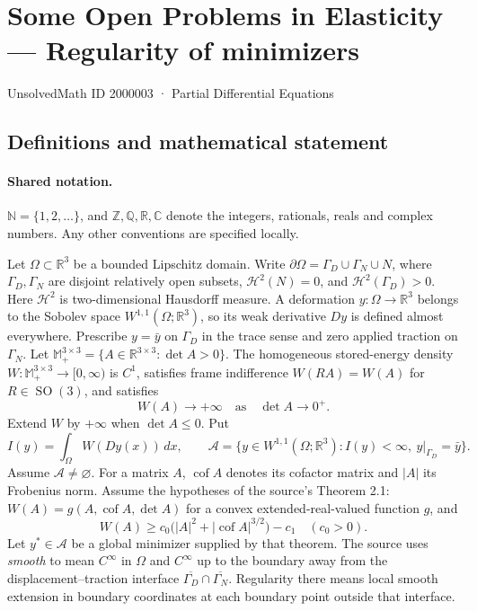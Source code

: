 \documentclass[11pt]{book}
\begin{document}
\setcounter{section}{2000002}
\section{Some Open Problems in Elasticity — Regularity of minimizers}\label{2000003}
{\small\sffamily UnsolvedMath ID 2000003 · Partial Differential Equations}
\subsection{Definitions and mathematical statement}

\paragraph{Shared notation.}$\mathbb N=\{1,2,\ldots\}$, and $\mathbb Z,\mathbb Q,\mathbb R,\mathbb C$ denote the integers, rationals, reals and complex numbers. Any other conventions are specified locally.


Let $\Omega\subset\mathbb R^3$ be a bounded Lipschitz domain. Write $\partial\Omega=\Gamma_D\cup\Gamma_N\cup N$, where $\Gamma_D,\Gamma_N$ are disjoint relatively open subsets, $\mathcal H^2(N)=0$, and $\mathcal H^2(\Gamma_D)>0$. Here $\mathcal H^2$ is two-dimensional Hausdorff measure. A deformation $y:\Omega\to\mathbb R^3$ belongs to the Sobolev space $W^{1,1}(\Omega;\mathbb R^3)$, so its weak derivative $Dy$ is defined almost everywhere. Prescribe $y=\bar y$ on $\Gamma_D$ in the trace sense and zero applied traction on $\Gamma_N$.
Let $\mathbb M_+^{3\times3}=\{A\in\mathbb R^{3\times3}:\det A>0\}$. The homogeneous stored-energy density $W:\mathbb M_+^{3\times3}\to[0,\infty)$ is $C^1$, satisfies frame indifference $W(RA)=W(A)$ for $R\in\operatorname{SO}(3)$, and satisfies
\[
 W(A)\longrightarrow+\infty\quad\text{as}\quad\det A\longrightarrow0^+.
\]
Extend $W$ by $+\infty$ when $\det A\le0$. Put
\[
 I(y)=\int_\Omega W(Dy(x))\,dx,\qquad
 \mathcal A=\{y\in W^{1,1}(\Omega;\mathbb R^3):I(y)<\infty,\ y|_{\Gamma_D}=\bar y\}.
\]
Assume $\mathcal A\ne\varnothing$. For a matrix $A$, $\operatorname{cof}A$ denotes its cofactor matrix and $|A|$ its Frobenius norm.
Assume the hypotheses of the source's Theorem 2.1: $W(A)=g(A,\operatorname{cof}A,\det A)$ for a convex extended-real-valued function $g$, and
\[
 W(A)\ge c_0\bigl(|A|^2+|\operatorname{cof}A|^{3/2}\bigr)-c_1
 \quad(c_0>0).
\]
Let $y^*\in\mathcal A$ be a global minimizer supplied by that theorem. The source uses \emph{smooth} to mean $C^\infty$ in $\Omega$ and $C^\infty$ up to the boundary away from the displacement--traction interface $\overline{\Gamma_D}\cap\overline{\Gamma_N}$. Regularity there means local smooth extension in boundary coordinates at each boundary point outside that interface.
\end{document}
